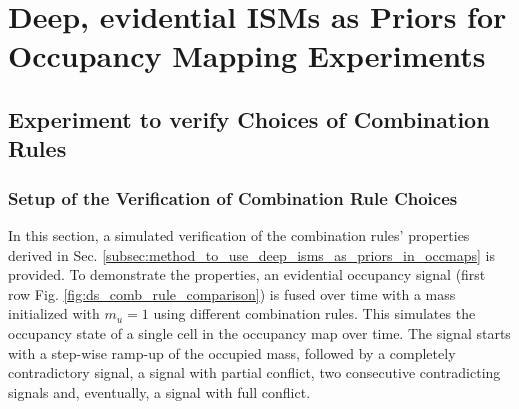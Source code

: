 \chapter{Deep, evidential ISMs as Priors for Occupancy Mapping Experiments}
\label{ch:deep_ev_isms_as_prior_for_occmaps_exp}
%
\section{Experiment to verify Choices of Combination Rules}
\label{sec:exp_choice_comb_rule}
%
\subsection{Setup of the Verification of Combination Rule Choices}
\label{subsec:setup_choice_comb_rule}
In this section, a simulated verification of the combination rules' properties derived in Sec. \ref{subsec:method_to_use_deep_isms_as_priors_in_occmaps} is provided. To demonstrate the properties, an evidential occupancy signal (first row Fig. \ref{fig:ds_comb_rule_comparison}) is fused over time with a mass initialized with $m_u = 1$ using different combination rules. This simulates the occupancy state of a single cell in the occupancy map over time. The signal starts with a step-wise ramp-up of the occupied mass, followed by a completely contradictory signal, a signal with partial conflict, two consecutive contradicting signals and, eventually, a signal with full conflict.
%
